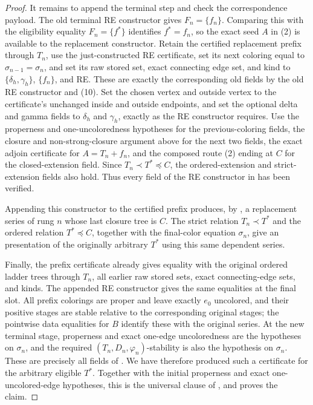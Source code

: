\begin{proof}
It remains to append the terminal step and check the correspondence
payload.  The old terminal RE constructor gives
\(F_n=\{f_n\}\).  Comparing this with the eligibility equality
\(F_n=\{f^*\}\) identifies \(f^*=f_n\), so the exact seed \(A\) in
(2) is available to the replacement constructor.  Retain the certified
replacement prefix through \(T_n\), use the just-constructed RE
certificate, set its next coloring equal to
\(\sigma_{n-1}=\sigma_n\), and set its raw stored set, exact connecting
edge set, and kind to
\(\{\delta_h,\gamma_h\}\), \(\{f_n\}\), and RE.  These are exactly
the corresponding old fields by the old RE constructor and (10).  Set
the chosen vertex and outside vertex to the certificate's unchanged
inside and outside endpoints, and set the optional delta and gamma fields
to \(\delta_h\) and \(\gamma_h\), exactly as the RE constructor requires.
Use
the properness and one-uncoloredness hypotheses for the previous-coloring
fields, the closure and non-strong-closure argument above for the next
two fields, the exact adjoin certificate for \(A=T_n+f_n\), and the
composed route (2) ending at \(C\) for the closed-extension field.  Since
\(T_n\prec T^*\preccurlyeq C\), the ordered-extension and strict-extension
fields also hold.  Thus every field of the RE constructor in
 has been verified.

Appending this constructor to the certified prefix produces, by
, a replacement series of rung \(n\) whose
last closure tree is \(C\).  The strict relation
\(T_n\prec T^*\) and the ordered relation \(T^*\preccurlyeq C\), together
with the final-color equation \(\sigma_n\), give an
 presentation of the originally arbitrary
\(T^*\) using this same dependent series.

Finally, the prefix certificate already gives equality with the original
ordered ladder trees through \(T_n\), all earlier raw stored sets, exact
connecting-edge sets, and kinds.  The appended RE constructor gives the
same equalities at the final slot.  All prefix colorings are proper and
leave exactly \(e_0\) uncolored, and their positive stages are stable
relative to the corresponding original stages; the pointwise data
equalities for \(B\) identify these with the original series.  At the
new terminal stage, properness and exact one-edge uncoloredness are the
hypotheses on \(\sigma_n\), and the required
\((T_n,D_n,\varphi_n)\)-stability is also the hypothesis on
\(\sigma_n\).  These are precisely all fields of
.  We have therefore produced
such a certificate for the arbitrary eligible \(T^*\).  Together with
the initial properness and exact one-uncolored-edge hypotheses, this is
the universal clause of , and proves the claim.
\end{proof}
